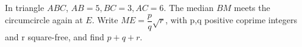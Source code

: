 In triangle $ABC$, $AB=5,BC=3,AC=6$. The median $BM$ meets the circumcircle again at $E$. Write $ME=\dfrac{p}{q}\sqrt r$, with p,q positive coprime integers and r square-free, and find $p+q+r$.

